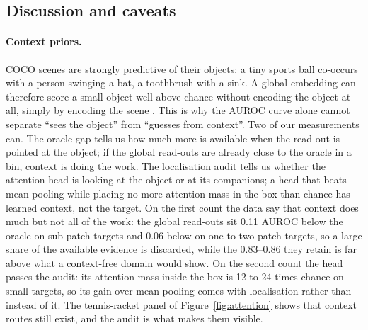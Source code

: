 \documentclass[10pt,letterpaper,twocolumn]{article}
\begin{document}
\subsection{Discussion and caveats}
\label{sec:discussion}
\paragraph{Context priors.}
COCO scenes are strongly predictive of their objects: a tiny sports ball co-occurs with a
person swinging a bat, a toothbrush with a sink. A global embedding can therefore score a small
object well above chance without encoding the object at all, simply by encoding the scene
\citep{oliva2007context}. This is why the AUROC curve alone cannot separate ``sees the object''
from ``guesses from context''. Two of our measurements can. The oracle gap tells us how much
more is available when the read-out is pointed at the object; if the global read-outs are
already close to the oracle in a bin, context is doing the work. The localisation audit tells
us whether the attention head is looking at the object or at its companions; a head that beats
mean pooling while placing no more attention mass in the box than chance has learned context,
not the target. On the first count the data say that context does much but not all of the
work: the global read-outs sit 0.11 AUROC below the oracle on sub-patch targets and 0.06 below
on one-to-two-patch targets, so a large share of the available evidence is discarded, while the
0.83--0.86 they retain is far above what a context-free domain would show. On the second count
the head passes the audit: its attention mass inside the box is 12 to 24 times chance on small
targets, so its gain over mean pooling comes with localisation rather than instead of it. The
tennis-racket panel of Figure~\ref{fig:attention} shows that context routes still exist, and
the audit is what makes them visible.
\end{document}
